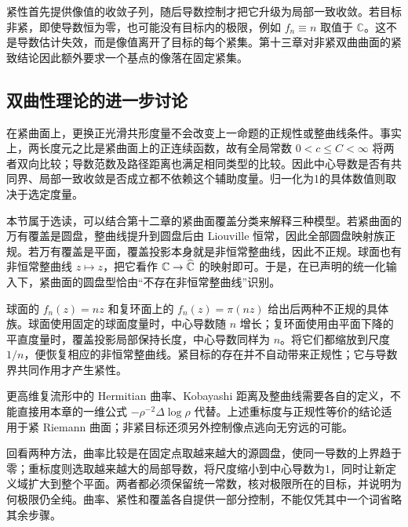 \ProseParagraphBreak
紧性首先提供像值的收敛子列，随后导数控制才把它升级为局部一致收敛。若目标非紧，即使导数恒为零，也可能没有目标内的极限，例如 \(f_n\equiv n\) 取值于 \(\mathbb C\)。这不是导数估计失效，而是像值离开了目标的每个紧集。第十三章对非紧双曲曲面的紧致结论因此额外要求一个基点的像落在固定紧集。

\subsection{双曲性理论的进一步讨论}
\label{b3:subsec:140604}

在紧曲面上，更换正光滑共形度量不会改变上一命题的正规性或整曲线条件。事实上，两长度元之比是紧曲面上的正连续函数，故有全局常数 \(0<c\le C<\infty\) 将两者双向比较；导数范数及路径距离也满足相同类型的比较。因此中心导数是否有共同界、局部一致收敛是否成立都不依赖这个辅助度量。归一化为1的具体数值则取决于选定度量。

\ProseParagraphBreak
本节属于选读，可以结合第十二章的紧曲面覆盖分类来解释三种模型。若紧曲面的万有覆盖是圆盘，整曲线提升到圆盘后由 Liouville 恒常，因此全部圆盘映射族正规。若万有覆盖是平面，覆盖投影本身就是非恒常整曲线，因此不正规。球面也有非恒常整曲线 \(z\mapsto z\)，把它看作 \(\mathbb C\to\widehat{\mathbb C\kern0pt}\) 的映射即可。于是，在已声明的统一化输入下，紧曲面的圆盘型恰由“不存在非恒常整曲线”识别。

\ProseParagraphBreak
球面的 \(f_n(z)=nz\) 和复环面上的 \(f_n(z)=\pi(nz)\) 给出后两种不正规的具体族。球面使用固定的球面度量时，中心导数随 \(n\) 增长；复环面使用由平面下降的平直度量时，覆盖投影局部保持长度，中心导数同样为 \(n\)。将它们都缩放到尺度 \(1/n\)，便恢复相应的非恒常整曲线。紧目标的存在并不自动带来正规性；它与导数界共同作用才产生紧性。

\ProseParagraphBreak
更高维复流形中的 Hermitian 曲率、Kobayashi 距离及整曲线需要各自的定义，不能直接用本章的一维公式 \(-\rho^{-2}\Delta\log\rho\) 代替。上述重标度与正规性等价的结论适用于紧 Riemann 曲面；非紧目标还须另外控制像点逃向无穷远的可能。

\ProseParagraphBreak
回看两种方法，曲率比较是在固定点取越来越大的源圆盘，使同一导数的上界趋于零；重标度则选取越来越大的局部导数，将尺度缩小到中心导数为1，同时让新定义域扩大到整个平面。两者都必须保留统一常数，核对极限所在的目标，并说明为何极限仍全纯。曲率、紧性和覆盖各自提供一部分控制，不能仅凭其中一个词省略其余步骤。
